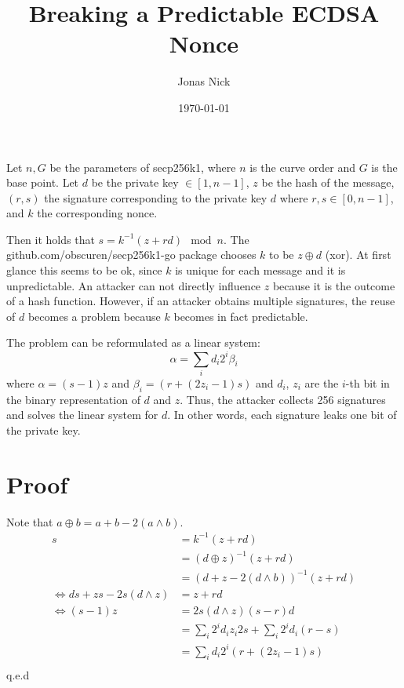 \documentclass[11pt,a4paper,oneside]{article}
\title{Breaking a Predictable ECDSA Nonce}
\date{\today}
\author{Jonas Nick}
\begin{document}
\maketitle 
Let $n, G$ be the parameters of secp256k1, where $n$ is the curve order and $G$ is the base point.
Let $d$ be the private key $\in [1, n-1]$, $z$ be the hash of the message, $(r,s)$ the signature corresponding
to the private key $d$ where $r,s \in [0, n-1]$, and $k$ the corresponding nonce.

Then it holds that $s=k^{-1}(z+rd)\mod n$. The github.com/obscuren/secp256k1-go package chooses $k$ to be
$z\oplus d$ (xor). 
At first glance this seems to be ok, since $k$ is unique for each message and
it is unpredictable. An attacker can not directly influence $z$ because it is the outcome of a hash function.
However, if an attacker obtains multiple signatures, the reuse of $d$ becomes a problem because $k$ 
becomes in fact predictable. 

The problem can be reformulated as a linear system:
\begin{equation}
    \alpha = \sum_i d_i 2^i \beta_i
\end{equation}
where $\alpha = (s-1)z$ and $\beta_i = (r + (2z_i - 1)s)$ and $d_i$, $z_i$ are the $i$-th bit in the binary representation of $d$ and $z$.
Thus, the attacker collects 256 signatures and solves the linear system for $d$. 
In other words, each signature leaks one bit of the private key.

\section{Proof}

Note that $a \oplus b = a + b - 2(a\wedge b)$.
\begin{align*}
s&=k^{-1}(z+rd) \\
    &= (d\oplus z)^{-1}(z+rd)\\
    &= (d + z - 2(d\wedge b))^{-1}(z+rd)\\
    \iff ds + zs - 2s(d\wedge z)&= z + rd\\
    \iff (s-1)z &= 2s(d\wedge z) (s-r)d\\
                &= \sum_i 2^i d_i z_i 2s + \sum_i 2^i d_i (r-s) \\
                &= \sum_i d_i 2^i (r + (2z_i - 1)s) \\
\end{align*}
q.e.d
\end{document}
